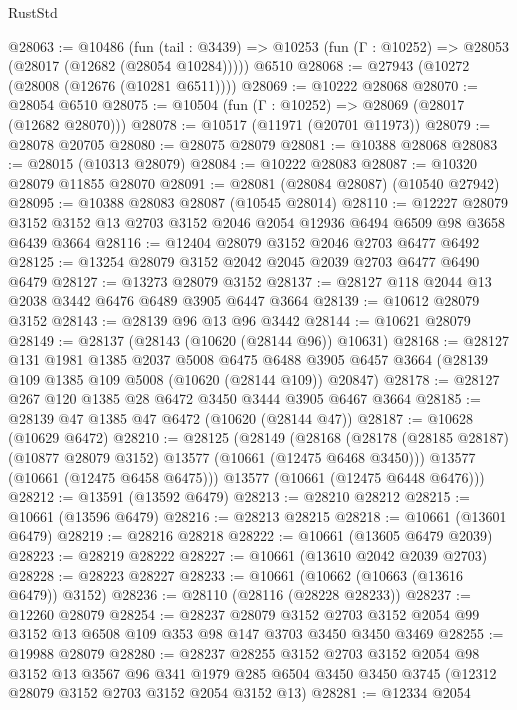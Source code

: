 \begin{lexlean}{RustStd}
\begin{coremodule}
@28063 := @10486
    (fun (tail : @3439) => @10253 (fun (Γ : @10252) => @28053 (@28017 (@12682 (@28054 @10284)))))
    @6510
@28068 := @27943 (@10272 (@28008 (@12676 (@10281 @6511))))
@28069 := @10222 @28068
@28070 := @28054 @6510
@28075 := @10504 (fun (Γ : @10252) => @28069 (@28017 (@12682 @28070)))
@28078 := @10517 (@11971 (@20701 @11973))
@28079 := @28078 @20705
@28080 := @28075 @28079
@28081 := @10388 @28068
@28083 := @28015 (@10313 @28079)
@28084 := @10222 @28083
@28087 := @10320 @28079 @11855 @28070
@28091 := @28081 (@28084 @28087) (@10540 @27942)
@28095 := @10388 @28083 @28087 (@10545 @28014)
@28110 := @12227
    @28079
    @3152
    @3152
    @13
    @2703
    @3152
    @2046
    @2054
    @12936
    @6494
    @6509
    @98
    @3658
    @6439
    @3664
@28116 := @12404 @28079 @3152 @2046 @2703 @6477 @6492
@28125 := @13254 @28079 @3152 @2042 @2045 @2039 @2703 @6477 @6490 @6479
@28127 := @13273 @28079 @3152
@28137 := @28127 @118 @2044 @13 @2038 @3442 @6476 @6489 @3905 @6447 @3664
@28139 := @10612 @28079 @3152
@28143 := @28139 @96 @13 @96 @3442
@28144 := @10621 @28079
@28149 := @28137 (@28143 (@10620 (@28144 @96)) @10631)
@28168 := @28127
    @131
    @1981
    @1385
    @2037
    @5008
    @6475
    @6488
    @3905
    @6457
    @3664
    (@28139 @109 @1385 @109 @5008 (@10620 (@28144 @109)) @20847)
@28178 := @28127 @267 @120 @1385 @28 @6472 @3450 @3444 @3905 @6467 @3664
@28185 := @28139 @47 @1385 @47 @6472 (@10620 (@28144 @47))
@28187 := @10628 (@10629 @6472)
@28210 := @28125
    (@28149
      (@28168
        (@28178 (@28185 @28187) (@10877 @28079 @3152) @13577 (@10661 (@12475 @6468 @3450)))
        @13577
        (@10661 (@12475 @6458 @6475)))
      @13577
      (@10661 (@12475 @6448 @6476)))
@28212 := @13591 (@13592 @6479)
@28213 := @28210 @28212
@28215 := @10661 (@13596 @6479)
@28216 := @28213 @28215
@28218 := @10661 (@13601 @6479)
@28219 := @28216 @28218
@28222 := @10661 (@13605 @6479 @2039)
@28223 := @28219 @28222
@28227 := @10661 (@13610 @2042 @2039 @2703)
@28228 := @28223 @28227
@28233 := @10661 (@10662 (@10663 (@13616 @6479)) @3152)
@28236 := @28110 (@28116 (@28228 @28233))
@28237 := @12260 @28079
@28254 := @28237
    @28079
    @3152
    @2703
    @3152
    @2054
    @99
    @3152
    @13
    @6508
    @109
    @353
    @98
    @147
    @3703
    @3450
    @3450
    @3469
@28255 := @19988 @28079
@28280 := @28237
    @28255
    @3152
    @2703
    @3152
    @2054
    @98
    @3152
    @13
    @3567
    @96
    @341
    @1979
    @285
    @6504
    @3450
    @3450
    @3745
    (@12312 @28079 @3152 @2703 @3152 @2054 @3152 @13)
@28281 := @12334 @2054

\end{coremodule}
\end{lexlean}
